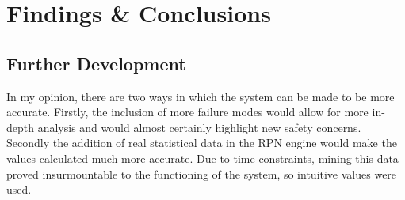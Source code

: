 \documentclass[12pt]{article} %
\begin{document}

\section{Findings \& Conclusions}
\subsection{Further Development}
In my opinion, there are two ways in which the system can be made to be more accurate. Firstly, the inclusion of more failure modes would allow for more in-depth analysis and would almost certainly highlight new safety concerns. Secondly the addition of real statistical data in the RPN engine would make the values calculated much more accurate. Due to time constraints, mining this data proved insurmountable to the functioning of the system, so intuitive values were used.
\end{document}
